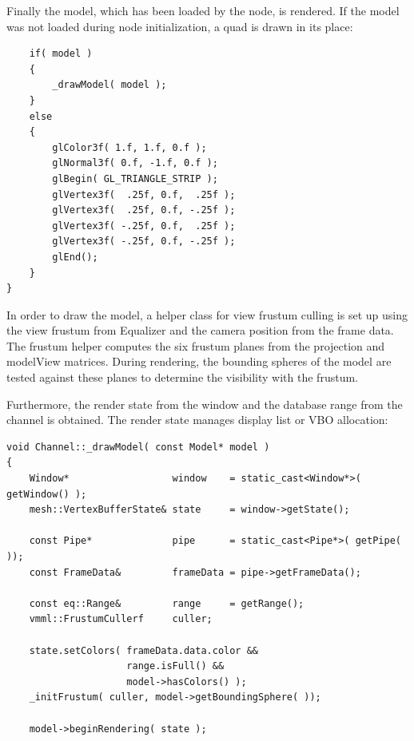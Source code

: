 \documentclass[10pt,a4]{scrartcl}
\begin{document}
Finally the model, which has been loaded by the node, is rendered. If
the model was not loaded during node initialization, a quad is drawn in
its place:

{\footnotesize\begin{lstlisting}
    if( model )
    {
        _drawModel( model );
    }
    else
    {
        glColor3f( 1.f, 1.f, 0.f );
        glNormal3f( 0.f, -1.f, 0.f );
        glBegin( GL_TRIANGLE_STRIP );
        glVertex3f(  .25f, 0.f,  .25f );
        glVertex3f(  .25f, 0.f, -.25f );
        glVertex3f( -.25f, 0.f,  .25f );
        glVertex3f( -.25f, 0.f, -.25f );
        glEnd();
    }
}
\end{lstlisting}}

In order to draw the model, a helper class for view frustum culling is
set up using the view frustum from Equalizer and the camera position
from the frame data. The frustum helper computes the six frustum planes
from the projection and modelView matrices. During rendering, the
bounding spheres of the model are tested against these planes to
determine the visibility with the frustum.

Furthermore, the render state from the window and the database range
from the channel is obtained. The render state manages display list or
VBO allocation:

{\footnotesize\begin{lstlisting}
void Channel::_drawModel( const Model* model )
{
    Window*                  window    = static_cast<Window*>( getWindow() );
    mesh::VertexBufferState& state     = window->getState();

    const Pipe*              pipe      = static_cast<Pipe*>( getPipe( ));
    const FrameData&         frameData = pipe->getFrameData();

    const eq::Range&         range     = getRange();
    vmml::FrustumCullerf     culler;

    state.setColors( frameData.data.color && 
                     range.isFull() && 
                     model->hasColors() );
    _initFrustum( culler, model->getBoundingSphere( ));

    model->beginRendering( state );
        
\end{lstlisting}}
\end{document}
